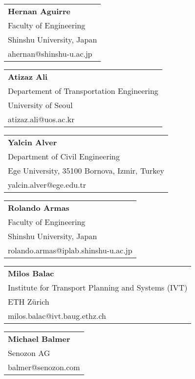 \begin{tabular}[width=0.48\textwidth]{@{}l}
\textbf{Hernan Aguirre} \\
Faculty of Engineering \\
Shinshu University, Japan \\
ahernan@shinshu-u.ac.jp  \\
\end{tabular}

\begin{tabular}[width=0.48\textwidth]{@{}l}
\textbf{Atizaz Ali} \\
Departement of Transportation Engineering \\
University of Seoul \\
atizaz.ali@uos.ac.kr \\
\end{tabular}

\begin{tabular}[width=0.48\textwidth]{@{}l}
\textbf{Yalcin Alver} \\
Department of Civil Engineering \\
Ege University, 35100 Bornova, Izmir, Turkey \\
yalcin.alver@ege.edu.tr \\
\end{tabular}

\begin{tabular}[width=0.48\textwidth]{@{}l}
\textbf{Rolando Armas} \\
Faculty of Engineering \\
Shinshu University, Japan \\
rolando.armas@iplab.shinshu-u.ac.jp \\
\end{tabular}

\begin{tabular}[width=0.48\textwidth]{@{}l}
\textbf{Milos Balac} \\
Institute for Transport Planning and Systems (IVT) \\
ETH Zürich \\
milos.balac@ivt.baug.ethz.ch \\
\end{tabular}

\begin{tabular}[width=0.48\textwidth]{@{}l}
\textbf{Michael Balmer} \\
Senozon AG \\
balmer@senozon.com \\
\end{tabular}

